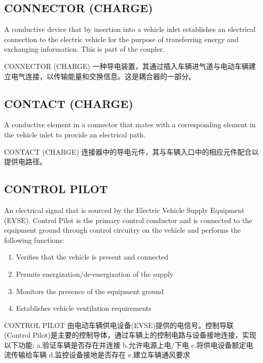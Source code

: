     \subsection*{CONNECTOR (CHARGE) }
        \label{def6}
        A conductive device that by insertion into a vehicle inlet establishes an electrical connection to the electric vehicle for the 
        purpose of transferring energy and exchanging information. This is part of the coupler. 
        \begin{definition}{CONNECTOR (CHARGE)}
            一种导电装置，其通过插入车辆进气道与电动车辆建立电气连接，以传输能量和交换信息。这是耦合器的一部分。
        \end{definition}

    \subsection*{CONTACT (CHARGE) }
        \label{def7}    
        A conductive element in a connector that mates with a corresponding element in the vehicle inlet to provide an electrical 
        path. 
        \begin{definition}{CONTACT (CHARGE)}
            连接器中的导电元件，其与车辆入口中的相应元件配合以提供电路径。
        \end{definition}


        \subsection*{CONTROL PILOT}
        \label{def8}   
            An electrical signal that is sourced by the Electric Vehicle Supply Equipment (EVSE). Control Pilot is the primary control conductor and is connected to the equipment ground through control circuitry on the vehicle and performs the following functions: 
        \begin{enumerate}
            \item Verifies that the vehicle is present and connected 
            \item Permits energization/de-energization of the supply 
            \item Monitors the presence of the equipment ground
            \item Establishes vehicle ventilation requirements
        \end{enumerate}
        \begin{definition}{CONTROL PILOT}                        
        由电动车辆供电设备(EVSE)提供的电信号。控制导联(Control Pilot)是主要的控制导体，通过车辆上的控制电路与设备接地连接，实现以下功能:
        a.验证车辆是否存在并连接
        b.允许电源上电/下电
        c.将供电设备额定电流传输给车辆
        d.监控设备接地是否存在
        e.建立车辆通风要求
        \end{definition}
        
